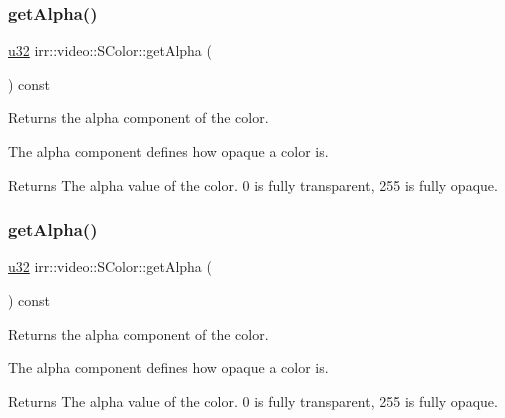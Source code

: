 \subsubsection{\texorpdfstring{get\+Alpha()}{getAlpha()}\hspace{0.1cm}{\footnotesize\ttfamily [1/2]}}
{\footnotesize\ttfamily \hyperlink{namespaceirr_a0416a53257075833e7002efd0a18e804}{u32} irr\+::video\+::\+S\+Color\+::get\+Alpha (\begin{DoxyParamCaption}{ }\end{DoxyParamCaption}) const\hspace{0.3cm}{\ttfamily [inline]}}



Returns the alpha component of the color. 

The alpha component defines how opaque a color is. \begin{DoxyReturn}{Returns}
The alpha value of the color. 0 is fully transparent, 255 is fully opaque. 
\end{DoxyReturn}
\mbox{\label{classirr_1_1video_1_1SColor_a8b0bcff9036b06e3483978a84a924b91}} 
\subsubsection{\texorpdfstring{get\+Alpha()}{getAlpha()}\hspace{0.1cm}{\footnotesize\ttfamily [2/2]}}
{\footnotesize\ttfamily \hyperlink{namespaceirr_a0416a53257075833e7002efd0a18e804}{u32} irr\+::video\+::\+S\+Color\+::get\+Alpha (\begin{DoxyParamCaption}{ }\end{DoxyParamCaption}) const\hspace{0.3cm}{\ttfamily [inline]}}



Returns the alpha component of the color. 

The alpha component defines how opaque a color is. \begin{DoxyReturn}{Returns}
The alpha value of the color. 0 is fully transparent, 255 is fully opaque. 
\end{DoxyReturn}
\mbox{\label{classirr_1_1video_1_1SColor_afb60ac456b2efc2f2a4f04a643293d26}} 
